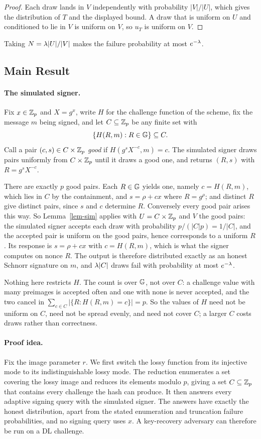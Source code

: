 \begin{proof}
Each draw lands in $V$ independently with probability $|V|/|U|$, which gives the
distribution of $T$ and the displayed bound. A draw that is uniform on $U$ and
conditioned to lie in $V$ is uniform on $V$, so $u_T$ is uniform on $V$.
\end{proof}

Taking $N=\lambda|U|/|V|$ makes the failure probability at most $e^{-\lambda}$.

\subsection{Main Result} \label{sec-lf-thm}

\paragraph*{The simulated signer.}
Fix $x\in\mathbb Z_p$ and $X=g^x$, write $H$ for the challenge function of the scheme,
fix the message $m$ being signed, and let $C\subseteq\mathbb Z_p$ be any finite set with
$$
\{H(R,m):R\in\mathbb{G}\}\subseteq C .
$$
Call a pair $(c,s)\in C\times\mathbb Z_p$ \emph{good} if $H(g^sX^{-c},m)=c$. The
simulated signer draws pairs uniformly from $C\times\mathbb Z_p$ until it draws a good
one, and returns $(R,s)$ with $R=g^sX^{-c}$.

There are exactly $p$ good pairs. Each $R\in\mathbb{G}$ yields one, namely $c=H(R,m)$,
which lies in $C$ by the containment, and $s=\rho+cx$ where $R=g^{\rho}$; and
distinct $R$ give distinct pairs, since $s$ and $c$ determine $R$. Conversely
every good pair arises this way. So Lemma~\ref{lem-sim} applies with
$U=C\times\mathbb Z_p$ and $V$ the good pairs: the simulated signer accepts each draw
with probability $p/(|C|p)=1/|C|$, and the accepted pair is uniform on the good
pairs, hence corresponds to a uniform $R$. Its response is $s=\rho+cx$ with
$c=H(R,m)$, which is what the signer computes on nonce $R$. The output is
therefore distributed exactly as an honest Schnorr signature on $m$, and
$\lambda|C|$ draws fail with probability at most $e^{-\lambda}$.

Nothing here restricts $H$. The count is over $\mathbb{G}$, not over $C$: a challenge
value with many preimages is accepted often and one with none is never accepted,
and the two cancel in $\sum_{c\in C}|\{R:H(R,m)=c\}|=p$. So the values of $H$
need not be uniform on $C$, need not be spread evenly, and need not cover $C$; a
larger $C$ costs draws rather than correctness.


\paragraph*{Proof idea.}
Fix the image parameter $r$. We first switch the lossy function from its
injective mode to its indistinguishable lossy mode. The reduction enumerates a
set covering the lossy image and reduces its elements modulo $p$, giving a set
$C\subseteq\mathbb Z_p$ that contains every challenge the hash can produce. It then
answers every adaptive signing query with the simulated signer. The answers have
exactly the honest distribution, apart from the stated enumeration and truncation failure
probabilities, and no signing query uses $x$. A key-recovery adversary can
therefore be run on a DL challenge.

